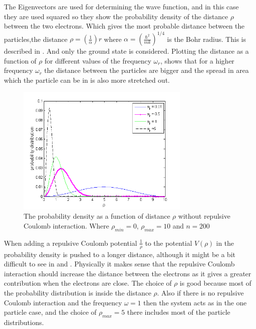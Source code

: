 The Eigenvectors are used for determining the wave function, and in this case they are used squared so they show the probability density of the distance $\rho$ between the two electrons. Which gives the most probable distance between the particles,the distance $\rho = (\frac{1}{\alpha})r$ where $\alpha = (\frac{\hbar^2}{mk})^{1/4}$ is the Bohr radius. This is described in . And only the ground state is considered. Plotting the distance as a function of $\rho$ for different values of the frequency $\omega_r$,  shows that for a higher frequency $\omega_r$ the distance between the particles are bigger and the spread in area which the particle can be in is also more stretched out. 

\begin{figure}[H]
	\centering
	\includegraphics[width=0.75\textwidth]{Figures/2particles_without.png}
	\caption{The probability density as a function of distance $\rho$ without repulsive Coulomb interaction. Where $\rho_{min} = 0$, $\rho_{max} = 10$ and $n = 200$  }
	\label{fig:ProbFuncOmegaWithout}
\end{figure}

When adding a repulsive Coulomb potential $\frac{1}{\rho}$ to the potential $V(\rho )$ in  the probability density is pushed to a longer distance, although it might be a bit difficult to see in  and . Physically it makes sense that the repulsive Coulomb interaction should increase the distance between the electrons as it gives a greater contribution when the electrons are close. The choice of $\rho$ is good because most of the probability distribution is inside the distance $\rho$. Also if there is no repulsive Coulomb interaction and the frequency $\omega = 1$ then the system acts as in the one particle case, and the choice of $\rho_{max} = 5$ there includes  most of the particle distributions. 

